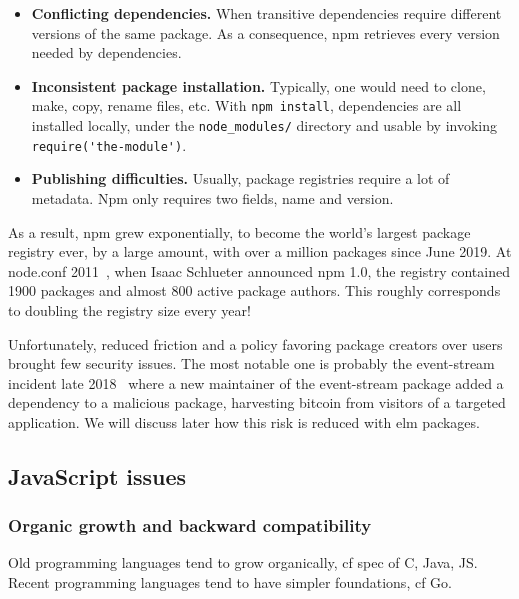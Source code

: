 \begin{itemize}
	\item \textbf{Conflicting dependencies.}
		When transitive dependencies require different versions of the same package.
		As a consequence, npm retrieves every version needed by dependencies.
	\item \textbf{Inconsistent package installation.}
		Typically, one would need to clone, make, copy, rename files, etc.
		With \verb|npm install|, dependencies are all installed locally,
		under the \verb|node_modules/| directory and usable by invoking
		\verb|require('the-module')|.
	\item \textbf{Publishing difficulties.}
		Usually, package registries require a lot of metadata.
		Npm only requires two fields, name and version.
\end{itemize}


As a result, npm grew exponentially, to become the world's largest package
registry ever, by a large amount, with over a million packages since June 2019.
At node.conf 2011~\cite{npm-video}, when Isaac Schlueter announced npm 1.0,
the registry contained 1900 packages and almost 800 active package authors.
This roughly corresponds to doubling the registry size every year!

Unfortunately, reduced friction and a policy favoring package creators over users
brought few security issues.
The most notable one is probably the event-stream incident late 2018~\cite{npm-event-stream}
where a new maintainer of the event-stream package added a dependency
to a malicious package, harvesting bitcoin from visitors of a targeted application.
We will discuss later how this risk is reduced with elm packages.


\subsection{JavaScript issues}%
\label{sub:javascript_issues}

\subsubsection{Organic growth and backward compatibility}%
\label{ssub:organic_growth_and_backward_compatibility}

Old programming languages tend to grow organically, cf spec of C, Java, JS.
Recent programming languages tend to have simpler foundations, cf Go.

